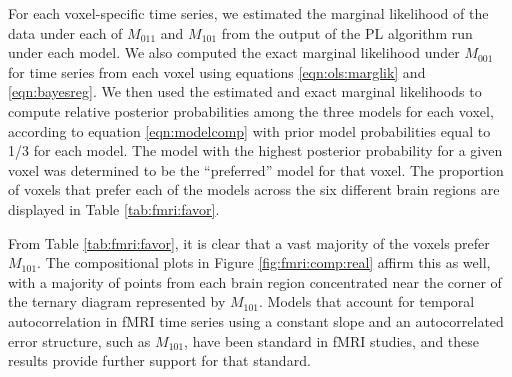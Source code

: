 For each voxel-specific time series, we estimated the marginal likelihood of the data under each of $M_{011}$ and $M_{101}$ from the output of the PL algorithm run under each model. We also computed the exact marginal likelihood under $M_{001}$ for time series from each voxel using equations \eqref{eqn:ols:marglik} and \eqref{eqn:bayesreg}. We then used the estimated and exact marginal likelihoods to compute relative posterior probabilities among the three models for each voxel, according to equation \eqref{eqn:modelcomp} with prior model probabilities equal to 1/3 for each model. The model with the highest posterior probability for a given voxel was determined to be the ``preferred'' model for that voxel. The proportion of voxels that prefer each of the models across the six different brain regions are displayed in Table \ref{tab:fmri:favor}.

From Table \ref{tab:fmri:favor}, it is clear that a vast majority of the voxels prefer $M_{101}$. The compositional plots in Figure \ref{fig:fmri:comp:real} affirm this as well, with a majority of points from each brain region concentrated near the corner of the ternary diagram represented by $M_{101}$. Models that account for temporal autocorrelation in fMRI time series using a constant slope and an autocorrelated error structure, such as $M_{101}$, have been standard in fMRI studies, and these results provide further support for that standard.


